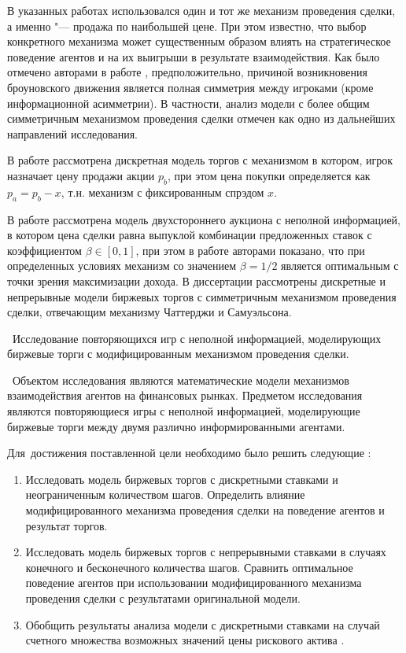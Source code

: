 В указанных работах использовался один и тот же механизм проведения сделки, а
именно "--- продажа по наибольшей цене. При этом известно, что выбор конкретного
механизма может существенным образом влиять на стратегическое поведение агентов
и на их выигрыши в результате взаимодействия. Как было отмечено авторами в
работе \cite{demeyer02}, предположительно, причиной возникновения броуновского
движения является полная симметрия между игроками (кроме информационной
асимметрии). В частности, анализ модели с более общим симметричным механизмом
проведения сделки отмечен как одно из дальнейших направлений исследования.

В работе \cite{sandomirskaya14} рассмотрена дискретная модель торгов с
механизмом в котором, игрок назначает цену продажи акции $p_b$, при этом цена
покупки определяется как $p_a = p_b - x$, т.н. механизм с фиксированным спрэдом $x$.

{\progress} В работе \cite{chatterjee83} рассмотрена модель двухстороннего
аукциона с неполной информацией, в котором цена сделки равна выпуклой комбинации
предложенных ставок с коэффициентом $\beta \in [0, 1]$, при этом в работе
\cite{myerson83} авторами показано, что при определенных условиях механизм со
значением $\beta = 1/2$ является оптимальным с точки зрения максимизации дохода.
В диссертации рассмотрены дискретные и непрерывные модели биржевых торгов с
симметричным механизмом проведения сделки, отвечающим механизму Чаттерджи и
Самуэльсона.

\aim\ Исследование повторяющихся игр с неполной информацией, моделирующих
биржевые торги с модифицированным механизмом проведения сделки.

\researchsubject\ Объектом исследования являются математические модели
механизмов взаимодействия агентов на финансовых рынках. Предметом исследования
являются повторяющиеся игры с неполной информацией, моделирующие биржевые торги
между двумя различно информированными агентами.

Для~достижения поставленной цели необходимо было решить следующие {\tasks}:
\begin{enumerate}
  \item Исследовать модель биржевых торгов с дискретными ставками и
    неограниченным количеством шагов. Определить влияние модифицированного
    механизма проведения сделки на поведение агентов и результат торгов.
  \item Исследовать модель биржевых торгов с непрерывными ставками в случаях
    конечного и бесконечного количества шагов. Сравнить оптимальное поведение
    агентов при использовании модифицированного механизма проведения сделки с
    результатами оригинальной модели.
  \item Обобщить результаты анализа модели с дискретными ставками на случай
    счетного множества возможных значений цены рискового актива .
\end{enumerate}

